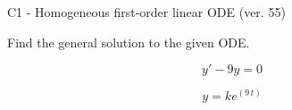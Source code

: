 \begin{exercise}
  \begin{exerciseTitle}C1 - Homogeneous first-order linear ODE (ver. 55)\end{exerciseTitle}
  \begin{exerciseStatement}
    
Find the general solution to the given ODE.

    
\[y'-9y=0\]

  \end{exerciseStatement}
  \begin{exerciseAnswer}
    
\[y= k e^{\left(9 \, t\right)}\]

  \end{exerciseAnswer}
\end{exercise}